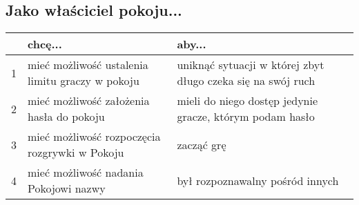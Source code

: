 \subsection{Jako właściciel pokoju...}
\begin{center}
    \begin{tabular}{ | l || p{6cm} | p{6cm} |}
    \hline
     & \textbf{chcę...} & \textbf{aby...} \\ \hline \hline
    1 & mieć możliwość ustalenia limitu graczy w pokoju & uniknąć sytuacji w której zbyt długo czeka się na swój ruch \\ \hline
    2 & mieć możliwość założenia hasła do pokoju & mieli do niego dostęp jedynie gracze, którym podam hasło \\ \hline
    3 & mieć możliwość rozpoczęcia rozgrywki w Pokoju & zacząć grę \\ \hline
    4 & mieć możliwość nadania Pokojowi nazwy & był rozpoznawalny pośród innych \\ \hline
    \end{tabular}
\end{center}

